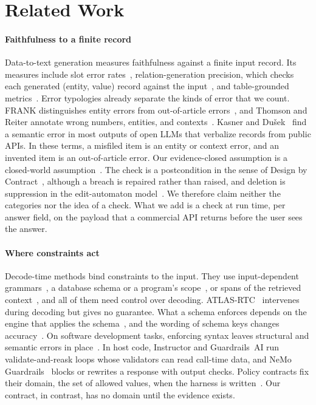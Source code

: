 \documentclass[journal]{IEEEtran}
\begin{document}
\section{Related Work}\label{sec:related}

\paragraph{Faithfulness to a finite record}
Data-to-text generation measures faithfulness against a finite input record.
Its measures include slot error rates~\cite{dusek2020e2e}, relation-generation
precision, which checks each generated (entity, value) record against the
input~\cite{wiseman2017challenges}, and table-grounded
metrics~\cite{dhingra2019parent}. Error typologies already separate the kinds of
error that we count. FRANK distinguishes entity errors from out-of-article
errors~\cite{pagnoni2021frank}, and Thomson and Reiter annotate wrong numbers,
entities, and contexts~\cite{thomson2020gold}. Kasner and Du\v{s}ek~\cite{kasner2024beyond} find a semantic error in most
outputs of open LLMs that verbalize records from public APIs. In these terms, a
misfiled item is an entity or context error, and an invented item is an
out-of-article error. Our evidence-closed assumption is a closed-world
assumption~\cite{reiter1978closed}. The check is a postcondition in the sense of
Design by Contract~\cite{meyer1992dbc}, although a breach is repaired rather
than raised, and deletion is suppression in the edit-automaton
model~\cite{ligatti2005edit,schneider2000enforceable}. We therefore claim neither
the categories nor the idea of a check. What we add is a check at run time, per
answer field, on the payload that a commercial API returns before the user sees
the answer.

\paragraph{Where constraints act}
Decode-time methods bind constraints to the input. They use input-dependent
grammars~\cite{gcd}, a database schema or a program's
scope~\cite{scholak2021picard,poesia2022synchromesh}, or spans of the retrieved
context~\cite{signe2026chyd}, and all of them need control over decoding.
ATLAS-RTC~\cite{cruz2026atlasrtc} intervenes during decoding but gives no
guarantee. What a schema enforces depends on the engine that applies the
schema~\cite{geng2025jsonschemabench}, and the wording of schema keys changes
accuracy~\cite{le2026schemakey}. On software development tasks, enforcing syntax
leaves structural and semantic errors in place~\cite{song2026structured}. In host
code, Instructor and Guardrails~AI run validate-and-reask loops whose validators
can read call-time data, and NeMo Guardrails~\cite{nemo} blocks or rewrites a
response with output checks. Policy contracts fix their domain, the set of
allowed values, when the harness is
written~\cite{ahn2026harness,zhang2025rvllm,winston2026solver}. Our contract, in
contrast, has no domain until the evidence exists.
\end{document}
